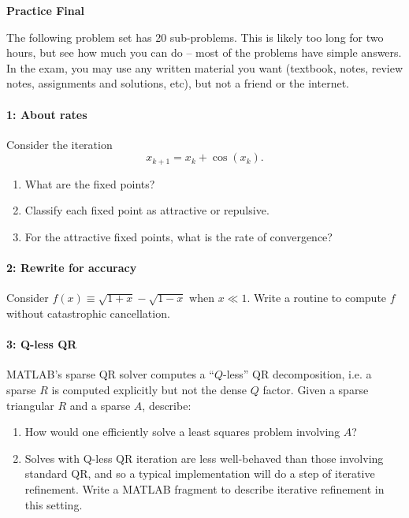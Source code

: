 \documentclass[12pt, leqno]{article}
\begin{document}
  \pagestyle{fancy}
  \fancyfoot{}
  \begin{center}
    {\large{\bf Practice Final}}
  \end{center}
  \lstset{language=matlab,columns=flexible}

The following problem set has 20 sub-problems.  This is likely too
long for two hours, but see how much you can do -- most of the problems
have simple answers.  In the exam, you may use any written material you want
(textbook, notes, review notes, assignments and solutions, etc),
but not a friend or the internet.

\paragraph{1: About rates}
Consider the iteration
\[
  x_{k+1} = x_k + \cos(x_k).
\]
\begin{enumerate}
\item What are the fixed points?
\item Classify each fixed point as attractive or repulsive.
\item For the attractive fixed points, what is the rate of
  convergence?
\end{enumerate}

\paragraph{2: Rewrite for accuracy}
Consider $f(x) \equiv \sqrt{1+x}-\sqrt{1-x}$ when $x \ll 1$.
Write a routine to compute $f$ without catastrophic cancellation.

\paragraph{3: Q-less QR}
MATLAB's sparse QR solver computes a ``$Q$-less'' QR decomposition,
i.e. a sparse $R$ is computed explicitly but not the dense $Q$ factor.
Given a sparse triangular $R$ and a sparse $A$, describe:
\begin{enumerate}
\item
  How would one efficiently solve a least squares problem involving $A$?
\item
  Solves with Q-less QR iteration are less well-behaved than those
  involving standard QR, and so a typical implementation will do a
  step of iterative refinement.  Write a MATLAB fragment to describe
  iterative refinement in this setting.
\end{enumerate}
\end{document}
